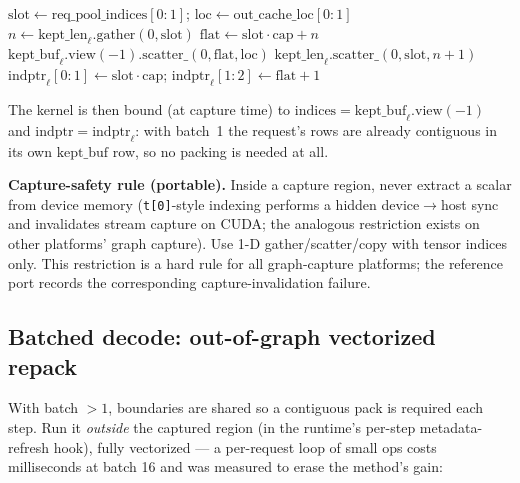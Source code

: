\documentclass[11pt]{article}
\begin{document}
\begin{algorithm}[h]
\caption{Per-step in-graph refresh, batch 1 (all MLA layers)}
\begin{algorithmic}[1]
\State $\mathrm{slot} \gets \mathrm{req\_pool\_indices}[0{:}1]$;\quad
       $\mathrm{loc} \gets \mathrm{out\_cache\_loc}[0{:}1]$
\State $n \gets \mathrm{kept\_len}_\ell.\mathrm{gather}(0, \mathrm{slot})$
\State $\mathrm{flat} \gets \mathrm{slot}\cdot \mathrm{cap} + n$
\State $\mathrm{kept\_buf}_\ell.\mathrm{view}(-1).\mathrm{scatter\_}(0, \mathrm{flat}, \mathrm{loc})$
\State $\mathrm{kept\_len}_\ell.\mathrm{scatter\_}(0, \mathrm{slot}, n{+}1)$
\State $\mathrm{indptr}_\ell[0{:}1] \gets \mathrm{slot}\cdot\mathrm{cap}$;\quad
       $\mathrm{indptr}_\ell[1{:}2] \gets \mathrm{flat}+1$
\EndFor
\end{algorithmic}
\end{algorithm}

The kernel is then bound (at capture time) to
$\mathrm{indices} = \mathrm{kept\_buf}_\ell.\mathrm{view}(-1)$ and
$\mathrm{indptr} = \mathrm{indptr}_\ell$: with batch~1 the request's rows
are already contiguous in its own $\mathrm{kept\_buf}$ row, so no packing is
needed at all.

\textbf{Capture-safety rule (portable).} Inside a capture region, never
extract a scalar from device memory (\texttt{t[0]}-style indexing performs a
hidden device$\to$host sync and invalidates stream capture on CUDA; the
analogous restriction exists on other platforms' graph capture). Use 1-D
gather/scatter/copy with tensor indices only. This restriction is a hard rule
for all graph-capture platforms; the reference port records the corresponding
capture-invalidation failure.

\subsection{Batched decode: out-of-graph vectorized repack}
With batch $>1$, boundaries are shared so a contiguous pack is required each
step. Run it \emph{outside} the captured region (in the runtime's per-step
metadata-refresh hook), fully vectorized --- a per-request loop of small ops
costs milliseconds at batch 16 and was measured to erase the method's gain:
\end{document}
